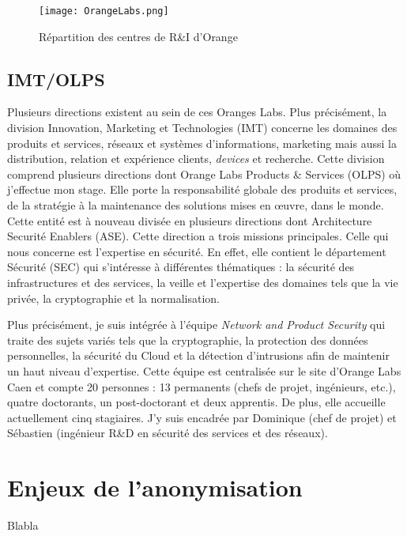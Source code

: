 \documentclass[11pt,oneside]{book}
\begin{document}
	\begin{figure}[!h]
		\begin{center}
			\label{FigOrangeLabs}
			\texttt{[image: OrangeLabs.png]}
			\caption{Répartition des centres de R\&I d'Orange}
		\end{center}
	\end{figure}

	
			\subsection{IMT/OLPS}
			Plusieurs directions existent au sein de ces Oranges Labs. Plus précisément, la division Innovation, Marketing et Technologies (IMT) concerne les domaines des produits et services, réseaux et systèmes d'informations, marketing mais aussi la distribution, relation et expérience clients, \emph{devices} et recherche. Cette division comprend plusieurs directions dont Orange Labs Products \& Services (OLPS) où j'effectue mon stage. Elle porte la responsabilité globale des produits et services, de la stratégie à la maintenance des solutions mises en \oe{}uvre, dans le monde. Cette entité est à nouveau divisée en plusieurs directions dont Architecture Securité Enablers (ASE). Cette direction a trois missions principales. Celle qui nous concerne est l'expertise en sécurité. En effet, elle contient le département Sécurité (SEC) qui s'intéresse à différentes thématiques : la sécurité des infrastructures et des services, la veille et l'expertise des domaines tels que la vie privée, la cryptographie et la normalisation.
	
	\medskip	
		
	Plus précisément, je suis intégrée à l'équipe \emph{Network and Product Security} qui traite des sujets variés tels que la cryptographie, la protection des données personnelles, la sécurité du Cloud et la détection d'intrusions afin de maintenir un haut niveau d'expertise. Cette équipe est centralisée sur le site d'Orange Labs Caen et compte 20 personnes : 13 permanents (chefs de projet, ingénieurs, etc.), quatre doctorants, un post-doctorant et deux apprentis. De plus, elle accueille actuellement cinq stagiaires. J'y suis encadrée par Dominique  (chef de projet) et Sébastien  (ingénieur R\&D en sécurité des services et des réseaux). 
	
		\newpage
		\section{Enjeux de l'anonymisation}
			Blabla
			
\end{document}
